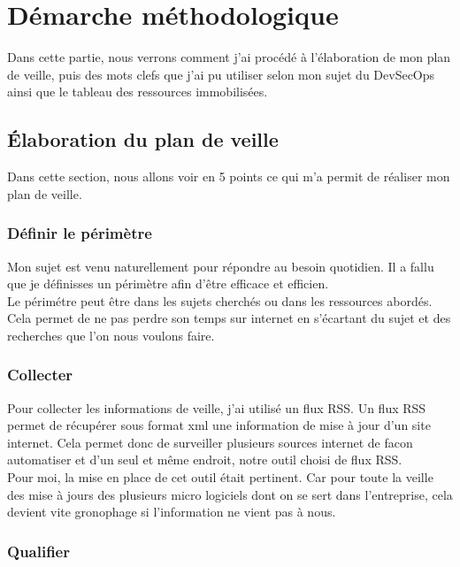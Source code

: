 \documentclass[11pt,a4paper,oneside]{book}
\begin{document}
\chapter{Démarche méthodologique}

Dans cette partie, nous verrons comment j'ai procédé à l'élaboration de mon plan de veille, puis des mots clefs que j'ai pu utiliser selon mon sujet du DevSecOps ainsi que le tableau des ressources immobilisées.

\section{Élaboration du plan de veille}

Dans cette section, nous allons voir en 5 points ce qui m'a permit de réaliser mon plan de veille.

\subsection{Définir le périmètre}

Mon sujet est venu naturellement pour répondre au besoin quotidien.
Il a fallu que je définisses un périmètre afin d'être efficace et efficien. \\
Le périmétre peut être dans les sujets cherchés ou dans les ressources abordés.
Cela permet de ne pas perdre son temps sur internet en s'écartant du sujet et des recherches que l'on nous voulons faire.

\subsection{Collecter}

Pour collecter les informations de veille, j'ai utilisé un flux RSS.
Un flux RSS permet de récupérer sous format xml une information de mise à jour d'un site internet. Cela permet donc de surveiller plusieurs sources internet de facon automatiser et d'un seul et même endroit, notre outil choisi de flux RSS. \\
Pour moi, la mise en place de cet outil était pertinent. Car pour toute la veille des mise à jours des plusieurs micro logiciels dont on se sert dans l'entreprise, cela devient vite gronophage si l'information ne vient pas à nous.

\subsection{Qualifier}
\end{document}
